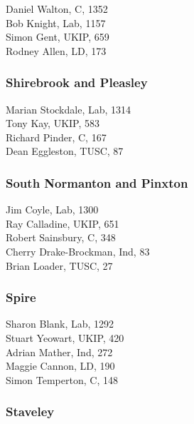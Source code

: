 \documentclass[a4paper,openany,10pt]{book}
\begin{document}


Daniel Walton, C, 1352\\
Bob Knight, Lab, 1157\\
Simon Gent, UKIP, 659\\
Rodney Allen, LD, 173\\


\subsubsection*{Shirebrook and Pleasley}



Marian Stockdale, Lab, 1314\\
Tony Kay, UKIP, 583\\
Richard Pinder, C, 167\\
Dean Eggleston, TUSC, 87\\


\subsubsection*{South Normanton and Pinxton}



Jim Coyle, Lab, 1300\\
Ray Calladine, UKIP, 651\\
Robert Sainsbury, C, 348\\
{Cherry Drake-Brockman}, Ind, 83\\
Brian Loader, TUSC, 27\\


\subsubsection*{Spire}



Sharon Blank, Lab, 1292\\
Stuart Yeowart, UKIP, 420\\
Adrian Mather, Ind, 272\\
Maggie Cannon, LD, 190\\
Simon Temperton, C, 148\\


\subsubsection*{Staveley}
\end{document}
